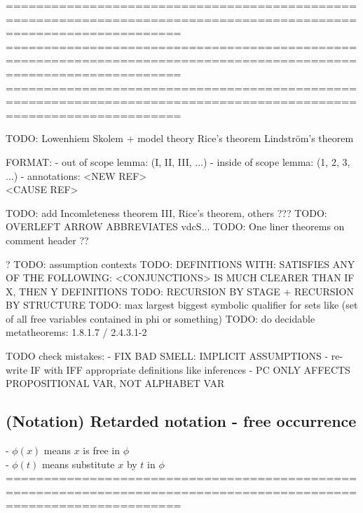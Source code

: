 \documentclass{book}
\begin{document}
	===================================================================================================================
	===================================================================================================================
	===================================================================================================================



TODO:
	Lowenhiem Skolem + model theory
	Rice's theorem
	Lindström's theorem


FORMAT:
	- out of scope lemma: (I, II, III, ...)
	- inside of scope lemma: (1, 2, 3, ...)
	- annotations: <NEW REF> \\ <CAUSE REF>

TODO: add Incomleteness theorem III, Rice's theorem, others ???
TODO: OVERLEFT ARROW ABBREVIATES vdc{S}...
TODO: One liner theorems on comment header ??

?
TODO: assumption contexts
TODO: DEFINITIONS WITH: SATISFIES ANY OF THE FOLLOWING: <CONJUNCTIONS> IS MUCH CLEARER THAN IF X, THEN Y DEFINITIONS
TODO: RECURSION BY STAGE + RECURSION BY STRUCTURE
TODO: max largest biggest symbolic qualifier for sets like (set of all free variables contained in phi or something)
TODO: do decidable metatheorems: 1.8.1.7 / 2.4.3.1-2

TODO check mistakes: 
	- FIX BAD SMELL: IMPLICIT ASSUMPTIONS
	- re-write IF with IFF appropriate definitions like inferences
	- PC ONLY AFFECTS PROPOSITIONAL VAR, NOT ALPHABET VAR

\subsection{(Notation) Retarded notation - free occurrence} %
	- $\phi(x)$ means $x$ is free in $\phi$ \\
	- $\phi(t)$ means substitute $x$ by $t$ in $\phi$ \\
	===================================================================================================================
\end{document}
